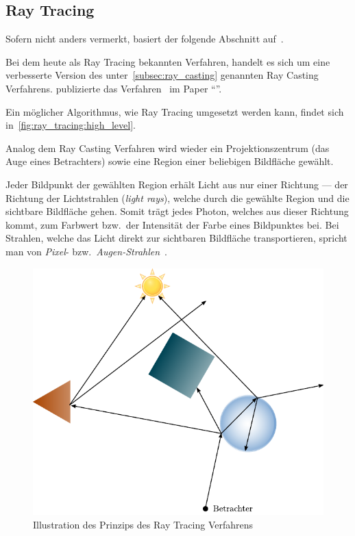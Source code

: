 \subsection{Ray Tracing}
\label{subsec:ray_tracing}

Sofern nicht anders vermerkt, basiert der folgende Abschnitt
auf~\cite[S. 1 bis 77]{glassner_introduction_1989}.

Bei dem heute als Ray Tracing bekannten Verfahren, handelt es sich um
eine verbesserte Version des unter~\ref{subsec:ray_casting} genannten
Ray Casting Verfahrens. \citeauthor{whitted_improved_1980} publizierte
das Verfahren~\citeyear{whitted_improved_1980} im Paper
``''.

Ein möglicher Algorithmus, wie Ray Tracing umgesetzt werden kann,
findet sich in~\autoref{fig:ray_tracing:high_level}.

Analog dem Ray Casting Verfahren wird wieder ein Projektionszentrum (das
Auge eines Betrachters) sowie eine Region einer beliebigen Bildfläche
gewählt.

Jeder Bildpunkt der gewählten Region erhält Licht aus nur einer Richtung
--- der Richtung der Lichtstrahlen (\textit{light rays}), welche durch
die gewählte Region und die sichtbare Bildfläche gehen. Somit trägt
jedes Photon, welches aus dieser Richtung kommt, zum Farbwert bzw.\ der
Intensität der Farbe eines Bildpunktes bei. Bei Strahlen, welche das
Licht direkt zur sichtbaren Bildfläche transportieren, spricht man von
\textit{Pixel}- bzw.\ \textit{Augen-Strahlen}~\parencite[S.
10]{glassner_introduction_1989}.

\begin{figure}[H]
    \centering
    \includegraphics{img/ray_tracing_scene.pdf}
    \caption{Illustration des Prinzips des Ray Tracing
        Verfahrens\protect\footnotemark}\label{fig:ray_tracing_scene}
\end{figure}


